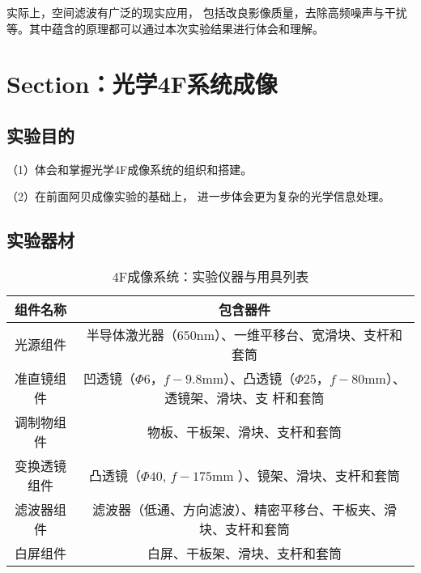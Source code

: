 \documentclass[11pt]{article}
\begin{document}
实际上，空间滤波有广泛的现实应用，
包括改良影像质量，去除高频噪声与干扰等。其中蕴含的原理都可以通过本次实验结果进行体会和理解。
































\newpage
\section[光学4F系统成像]{Section：光学4F系统成像}

\subsection{实验目的}

（1）体会和掌握光学4F成像系统的组织和搭建。

（2）在前面阿贝成像实验的基础上，
进一步体会更为复杂的光学信息处理。

\subsection{实验器材}

\begin{table}[htbp]
    \centering
    \begin{tabular}{cc}\toprule
        组件名称 & 包含器件\\  \midrule
        光源组件& 半导体激光器（$650$nm）、一维平移台、宽滑块、支杆和套筒\\ 
        准直镜组件& 凹透镜（$\Phi 6$，$f-9.8$mm）、凸透镜（$\Phi 25$，$f-80$mm）、透镜架、滑块、支
        杆和套筒\\ 
        调制物组件& 物板、干板架、滑块、支杆和套筒\\
        变换透镜组件& 凸透镜（$\Phi 40$, $f-175$mm ）、镜架、滑块、支杆和套筒\\ 
        滤波器组件& 滤波器（低通、方向滤波）、精密平移台、干板夹、滑块、支杆和套筒\\
        白屏组件& 白屏、干板架、滑块、支杆和套筒\\ 
        \bottomrule
    \end{tabular}
    \caption{4F成像系统：实验仪器与用具列表}
\end{table}
\end{document}
